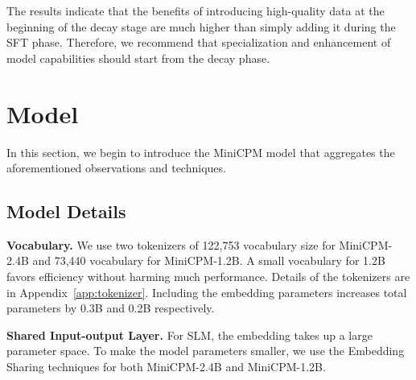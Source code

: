 \documentclass[dvipsnames]{article}
\begin{document}
The results indicate that the benefits of introducing high-quality data at the beginning of the decay stage are much higher than simply adding it during the SFT phase. Therefore, we recommend that specialization and enhancement of model capabilities should start from the decay phase. 

\section{Model}
In this section, we begin to introduce the MiniCPM model that aggregates the aforementioned observations and techniques. 
\label{sec:model}
\begin{table}[htbp]
    \centering
{}
    \caption{Model configurations for MiniCPM. N (B), $d_m$, $d_{ff}$, $d_h$, $n_q$, $n_{kv}$, $L$, Batch size (M), Tokens (T) represents the number of non-embedding parameters of the model, model hidden dimension, feedforward layer bottleneck dimension, attention head dimension, number of queries, number key/values, number of layers, training batch size, total training tokens.}
    \label{tab:model_configs}
\end{table}

\subsection{Model Details}
\noindent\textbf{Vocabulary.} We use two tokenizers of 122,753 vocabulary size for MiniCPM-2.4B and 73,440 vocabulary for MiniCPM-1.2B. A small vocabulary for 1.2B favors efficiency without harming much performance. Details of the tokenizers are in Appendix~\ref{app:tokenizer}. Including the embedding parameters increases total parameters by 0.3B and 0.2B respectively. 

\noindent\textbf{Shared Input-output Layer.}
For SLM, the embedding takes up a large parameter space. To make the model parameters smaller, we use the Embedding Sharing techniques for both MiniCPM-2.4B and MiniCPM-1.2B.
\end{document}
